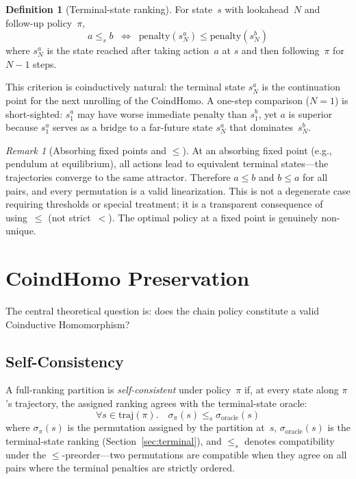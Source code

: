 \documentclass[9pt,a4paper]{article}
\theoremstyle{plain}
\theoremstyle{definition}
\newtheorem{definition}{Definition}
\theoremstyle{remark}
\newtheorem{remark}{Remark}
\begin{document}
\begin{definition}[Terminal-state ranking]
For state~$s$ with lookahead~$N$ and follow-up policy~$\pi$,
$$
a \le_s b \;\;\Longleftrightarrow\;\;
\text{penalty}(s_N^a) \le \text{penalty}(s_N^b)
$$
where $s_N^a$ is the state reached after taking action~$a$ at
$s$ and then following~$\pi$ for $N{-}1$ steps.
\end{definition}

This criterion is coinductively natural: the terminal state
$s_N^a$ is the continuation point for the next unrolling of
the CoindHomo. A one-step comparison ($N{=}1$) is short-sighted:
$s_1^a$ may have worse immediate penalty than $s_1^b$, yet $a$
is superior because $s_1^a$ serves as a bridge to a far-future
state $s_N^a$ that dominates~$s_N^b$.

\begin{remark}[Absorbing fixed points and $\le$]
At an absorbing fixed point (e.g., pendulum at equilibrium),
all actions lead to equivalent terminal states---the
trajectories converge to the same attractor. Therefore
$a \le b$ and $b \le a$ for all pairs, and every permutation
is a valid linearization. This is not a degenerate case
requiring thresholds or special treatment; it is a transparent
consequence of using~$\le$ (not strict~$<$). The optimal
policy at a fixed point is genuinely non-unique.
\end{remark}

\section{CoindHomo Preservation}
\label{sec:coind}

The central theoretical question is: does the chain policy constitute
a valid Coinductive Homomorphism?

\subsection{Self-Consistency}

A full-ranking partition is \emph{self-consistent} under
policy~$\pi$ if, at every state along $\pi$'s trajectory, the
assigned ranking agrees with the terminal-state oracle:
$$
\forall s \in \text{traj}(\pi).\quad
\sigma_\pi(s) \le_s \sigma_\text{oracle}(s)
$$
where $\sigma_\pi(s)$ is the permutation assigned by the partition
at~$s$, $\sigma_\text{oracle}(s)$ is the terminal-state ranking
(Section~\ref{sec:terminal}), and $\le_s$ denotes compatibility
under the $\le$-preorder---two permutations are compatible when
they agree on all pairs where the terminal penalties are strictly
ordered.
\end{document}
